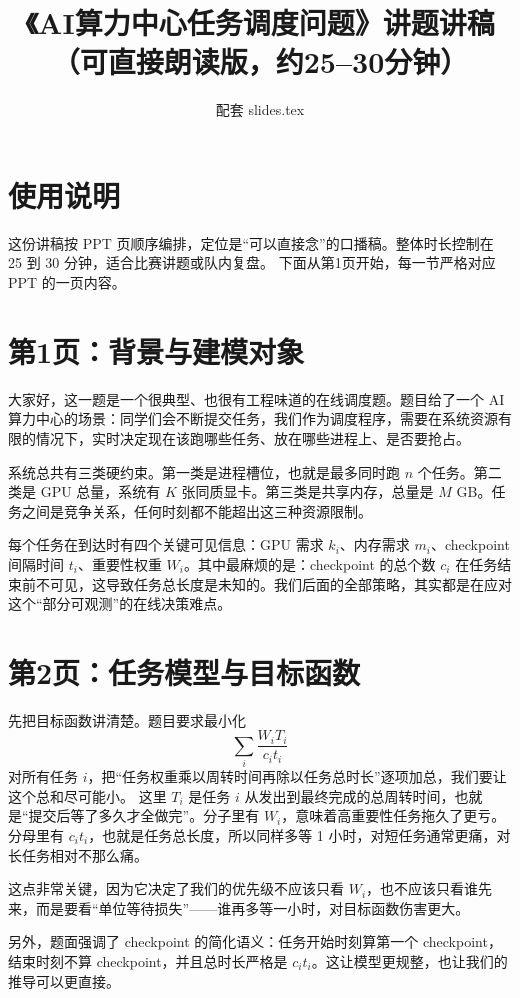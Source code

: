 \documentclass[12pt]{article}
\title{《AI算力中心任务调度问题》讲题讲稿（可直接朗读版，约25--30分钟）}
\author{配套 slides.tex}
\date{}
\begin{document}
\maketitle

\section*{使用说明}
这份讲稿按 PPT 页顺序编排，定位是“可以直接念”的口播稿。整体时长控制在 25 到 30 分钟，适合比赛讲题或队内复盘。
下面从第1页开始，每一节严格对应 PPT 的一页内容。

\section*{第1页：背景与建模对象}
大家好，这一题是一个很典型、也很有工程味道的在线调度题。题目给了一个 AI 算力中心的场景：同学们会不断提交任务，我们作为调度程序，需要在系统资源有限的情况下，实时决定现在该跑哪些任务、放在哪些进程上、是否要抢占。

系统总共有三类硬约束。第一类是进程槽位，也就是最多同时跑 $n$ 个任务。第二类是 GPU 总量，系统有 $K$ 张同质显卡。第三类是共享内存，总量是 $M$ GB。任务之间是竞争关系，任何时刻都不能超出这三种资源限制。

每个任务在到达时有四个关键可见信息：GPU 需求 $k_i$、内存需求 $m_i$、checkpoint 间隔时间 $t_i$、重要性权重 $W_i$。其中最麻烦的是：checkpoint 的总个数 $c_i$ 在任务结束前不可见，这导致任务总长度是未知的。我们后面的全部策略，其实都是在应对这个“部分可观测”的在线决策难点。

\section*{第2页：任务模型与目标函数}
先把目标函数讲清楚。题目要求最小化
\[
\sum_i \frac{W_i T_i}{c_i t_i}
\]
对所有任务 $i$，把“任务权重乘以周转时间再除以任务总时长”逐项加总，我们要让这个总和尽可能小。
这里 $T_i$ 是任务 $i$ 从发出到最终完成的总周转时间，也就是“提交后等了多久才全做完”。分子里有 $W_i$，意味着高重要性任务拖久了更亏。分母里有 $c_i t_i$，也就是任务总长度，所以同样多等 1 小时，对短任务通常更痛，对长任务相对不那么痛。

这点非常关键，因为它决定了我们的优先级不应该只看 $W_i$，也不应该只看谁先来，而是要看“单位等待损失”——谁再多等一小时，对目标函数伤害更大。

另外，题面强调了 checkpoint 的简化语义：任务开始时刻算第一个 checkpoint，结束时刻不算 checkpoint，并且总时长严格是 $c_i t_i$。这让模型更规整，也让我们的推导可以更直接。
\end{document}
